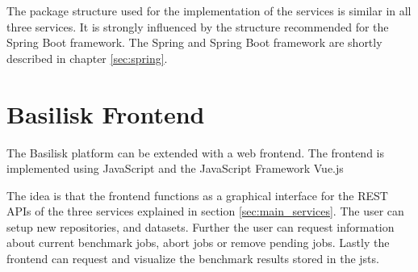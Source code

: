 The package structure used for the implementation of the services is similar in all three services.
It is strongly influenced by the structure recommended for the Spring Boot framework.
The Spring and Spring Boot framework are shortly described in chapter \ref{sec:spring}.






\section{Basilisk Frontend}
\label{sec:basilisk_frontend}
The Basilisk platform can be extended with a web frontend.
The frontend is implemented using JavaScript and the JavaScript Framework Vue.js

The idea is that the frontend functions as a graphical interface for the REST APIs of the three services explained in  section \ref{sec:main_services}.
The user can setup new repositories, \tsp{} and datasets.
Further the user can request information about current benchmark jobs, abort jobs or remove pending jobs.
Lastly the frontend can request and visualize the benchmark results stored in the \acl{jsts}.



